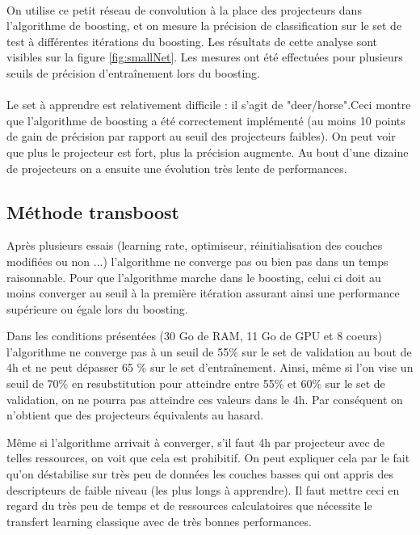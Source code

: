 \documentclass[11 pt]{article}
\begin{document}
\paragraph{} On utilise ce petit réseau de convolution \`a la place des projecteurs dans l'algorithme de boosting, et on mesure la précision de classification sur le set de test \`a différentes itérations du boosting. Les résultats de cette analyse sont visibles sur la figure \ref{fig:smallNet}. Les mesures ont été effectuées pour plusieurs seuils de précision d’entraînement lors du boosting.
\paragraph{}Le set à apprendre est relativement difficile : il s'agit de "deer/horse".Ceci montre que l'algorithme de boosting a été correctement implémenté (au moins 10 points de gain de précision par rapport au seuil des projecteurs faibles). On peut voir que plus le projecteur est fort, plus la précision augmente. Au bout d'une dizaine de projecteurs on a ensuite une évolution très lente de performances.

\subsection{Méthode transboost}

Après plusieurs essais (learning rate, optimiseur, réinitialisation des couches modifiées ou non ...) l'algorithme ne converge pas ou bien pas dans un temps raisonnable. Pour que l'algorithme marche dans le boosting, celui ci doit au moins converger au seuil à la première itération assurant ainsi une performance supérieure ou égale lors du boosting. 

\bigskip

Dans les conditions présentées (30 Go de RAM, 11 Go de GPU et 8 coeurs) l'algorithme ne converge pas à un seuil de 55\% sur le set de validation au bout de 4h et ne peut dépasser 65 \% sur le set d'entraînement. Ainsi, même si l'on vise un seuil de 70\% en resubstitution pour atteindre entre 55\% et 60\% sur le set de validation, on ne pourra pas atteindre ces valeurs dans le 4h. Par conséquent on n'obtient que des projecteurs équivalents au hasard.

\bigskip
Même si l'algorithme arrivait à converger, s'il faut 4h par projecteur avec de telles ressources, on voit que cela est prohibitif. On peut expliquer cela par le fait qu'on déstabilise sur très peu de données les couches basses qui ont appris des descripteurs de faible niveau (les plus longs à apprendre). Il faut mettre ceci en regard du très peu de temps et de ressources calculatoires que nécessite le transfert learning classique avec de très bonnes performances.
\end{document}
